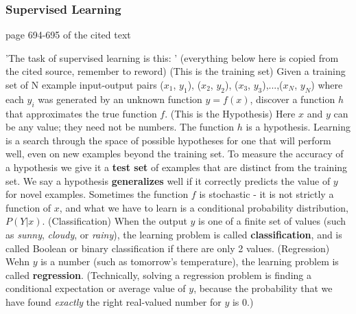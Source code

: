 

\subsubsection{Supervised Learning}

page 694-695 of the cited text

'The task of supervised learning is this: ' \cite{russell2016artificial} (everything below here is copied from the cited source, remember to reword)
(This is the training set)
Given a training set of N example input-output pairs
($x_1$, $y_1$), ($x_2$, $y_2$), ($x_3$, $y_3$),...,($x_N$, $y_N$)
where each $y_i$ was generated by an unknown function $y=f(x)$, discover a function $h$ that approximates the true function $f$.
(This is the Hypothesis)
Here $x$ and $y$ can be any value; they need not be numbers. The function $h$ is a hypothesis. Learning is a search through the space of possible hypotheses for one that will perform well, even on new examples beyond the training set. To measure the accuracy of a hypothesis we give it a \textbf{test set} of examples that are distinct from the training set. We say a hypothesis \textbf{generalizes} well if it correctly predicts the value of $y$ for novel examples. Sometimes the function $f$ is stochastic - it is not strictly a function of $x$, and what we have to learn is a conditional probability distribution, $P(Y|x)$.
(Classification)
When the output $y$ is one of a finite set of values (such as \textit{sunny}, \textit{cloudy}, or \textit{rainy}), the learning problem is called \textbf{classification}, and is called Boolean or binary classification if there are only 2 values.
(Regression)
Wehn $y$ is a number (such as tomorrow's temperature), the learning problem is called \textbf{regression}. (Technically, solving a regression problem is finding a conditional expectation or average value of $y$, because the probability that we have found \textit{exactly} the right real-valued number for $y$ is 0.)



